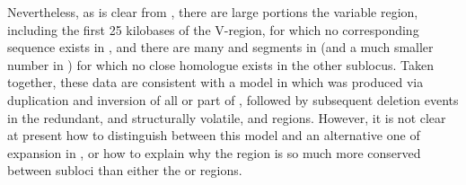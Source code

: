 Nevertheless, as is clear from , there are large portions the  variable region, including the first 25 kilobases of the V-region, for which no corresponding sequence exists in , and there are many \vh and \dh segments in  (and a much smaller number in ) for which no close homologue exists in the other sublocus. Taken together, these data are consistent with a model in which  was produced via duplication and inversion of all or part of , followed by subsequent deletion events in the redundant, and structurally volatile,  \vh and \dh regions. However, it is not clear at present how to distinguish between this model and an alternative one of expansion in , or how to explain why the \jh region is so much more conserved between subloci than either the \vh or \dh regions.

